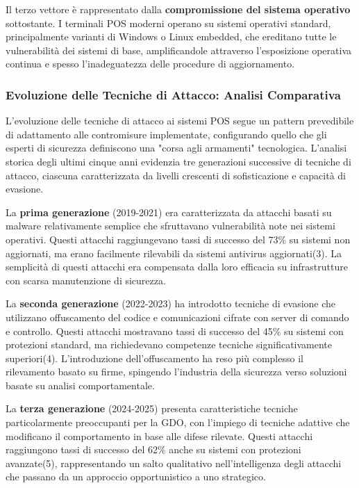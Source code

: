 \documentclass[12pt,a4paper,oneside]{book}
\begin{document}
Il terzo vettore è rappresentato dalla \textbf{compromissione del sistema operativo} sottostante. I terminali POS moderni operano su sistemi operativi standard, principalmente varianti di Windows o Linux embedded, che ereditano tutte le vulnerabilità dei sistemi di base, amplificandole attraverso l'esposizione operativa continua e spesso l'inadeguatezza delle procedure di aggiornamento.

\subsubsection{Evoluzione delle Tecniche di Attacco: Analisi Comparativa}

L'evoluzione delle tecniche di attacco ai sistemi POS segue un pattern prevedibile di adattamento alle contromisure implementate, configurando quello che gli esperti di sicurezza definiscono una "corsa agli armamenti" tecnologica. L'analisi storica degli ultimi cinque anni evidenzia tre generazioni successive di tecniche di attacco, ciascuna caratterizzata da livelli crescenti di sofisticazione e capacità di evasione.

La \textbf{prima generazione} (2019-2021) era caratterizzata da attacchi basati su malware relativamente semplice che sfruttavano vulnerabilità note nei sistemi operativi. Questi attacchi raggiungevano tassi di successo del 73\% su sistemi non aggiornati, ma erano facilmente rilevabili da sistemi antivirus aggiornati(3). La semplicità di questi attacchi era compensata dalla loro efficacia su infrastrutture con scarsa manutenzione di sicurezza.

La \textbf{seconda generazione} (2022-2023) ha introdotto tecniche di evasione che utilizzano offuscamento del codice e comunicazioni cifrate con server di comando e controllo. Questi attacchi mostravano tassi di successo del 45\% su sistemi con protezioni standard, ma richiedevano competenze tecniche significativamente superiori(4). L'introduzione dell'offuscamento ha reso più complesso il rilevamento basato su firme, spingendo l'industria della sicurezza verso soluzioni basate su analisi comportamentale.

La \textbf{terza generazione} (2024-2025) presenta caratteristiche tecniche particolarmente preoccupanti per la GDO, con l'impiego di tecniche adattive che modificano il comportamento in base alle difese rilevate. Questi attacchi raggiungono tassi di successo del 62\% anche su sistemi con protezioni avanzate(5), rappresentando un salto qualitativo nell'intelligenza degli attacchi che passano da un approccio opportunistico a uno strategico.
\end{document}
